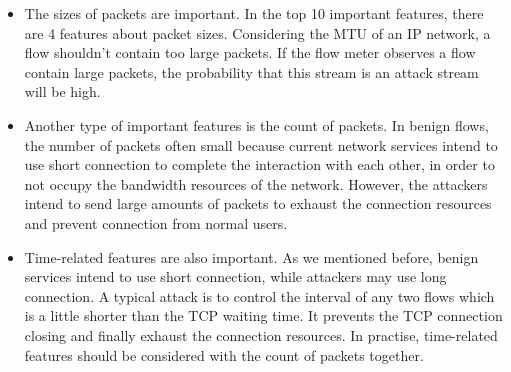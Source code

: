 \documentclass{ieeeaccess}
\theoremstyle{definition}
\begin{document}
\begin{itemize}
	\item The sizes of packets are important. In the top 10 important features, there are 4 features about packet sizes. Considering the MTU of an IP network, a flow shouldn’t contain too large packets. If the flow meter observes a flow contain large packets, the probability that this stream is an attack stream will be high. 
    \item Another type of important features is the count of packets. In benign flows, the number of packets often small because current network services intend to use short connection to complete the interaction with each other, in order to not occupy the bandwidth resources of the network. However, the attackers intend to send large amounts of packets to exhaust the connection resources and prevent connection from normal users. 
    \item Time-related features are also important. As we mentioned before, benign services intend to use short connection, while attackers may use long connection. A typical attack is to control the interval of any two flows which is a little shorter than the TCP waiting time. It prevents the TCP connection closing and finally exhaust the connection resources. In practise, time-related features should be considered with the count of packets together.
\end{itemize} 
\end{document}
